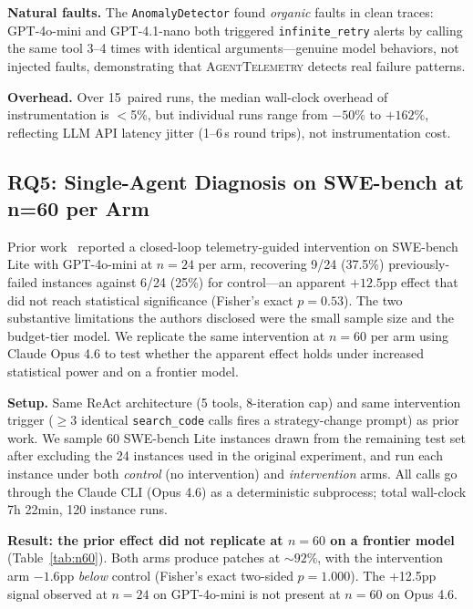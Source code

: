 \documentclass[11pt]{article}
\begin{document}
\textbf{Natural faults.}
The \texttt{AnomalyDetector} found \emph{organic} faults in clean
traces: GPT-4o-mini and GPT-4.1-nano both triggered
\texttt{infinite\_retry} alerts by calling the same tool 3--4 times
with identical arguments---genuine model behaviors, not injected faults,
demonstrating that \textsc{AgentTelemetry} detects real failure patterns.

\textbf{Overhead.}
Over 15~paired runs, the median wall-clock overhead of instrumentation
is $<$5\%, but individual runs range from $-50\%$ to $+162\%$,
reflecting LLM API latency jitter (1--6\,s round trips), not
instrumentation cost.

\subsection{RQ5: Single-Agent Diagnosis on SWE-bench at n=60 per Arm}
\label{sec:swebench}
\label{sec:rq6}

Prior work~\citep{aiware2026} reported a closed-loop telemetry-guided
intervention on SWE-bench Lite with GPT-4o-mini at $n{=}24$ per arm,
recovering 9/24 (37.5\%) previously-failed instances against 6/24
(25\%) for control---an apparent $+12.5$pp effect that did not reach
statistical significance (Fisher's exact $p{=}0.53$). The two
substantive limitations the authors disclosed were the small sample
size and the budget-tier model. We replicate the same intervention at
$n{=}60$ per arm using Claude Opus 4.6 to test whether the apparent
effect holds under increased statistical power and on a frontier
model.

\textbf{Setup.} Same ReAct architecture (5 tools, 8-iteration cap)
and same intervention trigger ($\geq{}3$ identical
\texttt{search\_code} calls fires a strategy-change prompt) as
prior work. We sample 60 SWE-bench Lite instances drawn from the
remaining test set after excluding the 24 instances used in the
original experiment, and run each instance under both
\emph{control} (no intervention) and \emph{intervention} arms. All
calls go through the Claude CLI (Opus 4.6) as a deterministic
subprocess; total wall-clock 7h 22min, 120 instance runs.

\textbf{Result: the prior effect did not replicate at $n{=}60$ on a
frontier model} (Table~\ref{tab:n60}). Both arms produce patches at
$\sim{}92\%$, with the intervention arm $-1.6$pp \emph{below} control
(Fisher's exact two-sided $p{=}1.000$). The +12.5pp signal observed at
$n{=}24$ on GPT-4o-mini is not present at $n{=}60$ on Opus 4.6.
\end{document}
